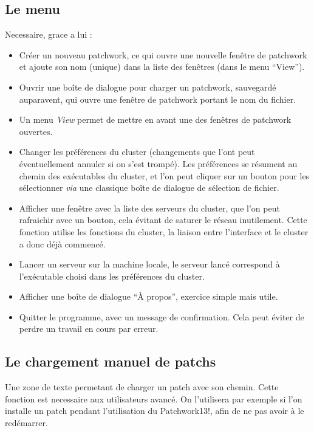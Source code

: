 \subsection{Le menu}
Necessaire, grace a lui :
\begin{itemize}
\item
  Cr\'eer un nouveau patchwork, ce qui ouvre une nouvelle fen\^etre
  de patchwork et ajoute son nom (unique) dans la liste des fen\^etres
  (dans le menu ``View'').

\item
  Ouvrir une bo\^ite de dialogue pour charger un patchwork, sauvegard\'e 
  auparavent, qui ouvre une fen\^etre de patchwork portant le nom du fichier.

\item
  Un menu {\it View} permet de mettre en avant une des fen\^etres de 
  patchwork ouvertes.

\item
  Changer les pr\'ef\'erences du cluster (changements que l'ont
  peut \'eventuellement annuler si on s'est tromp\'e).
  Les pr\'ef\'erences se r\'esument au chemin des ex\'ecutables du cluster, 
  et l'on peut cliquer sur un bouton pour les s\'electionner {\it via} une
  classique bo\^ite de dialogue de s\'election de fichier.

\item
  Afficher une fen\^etre avec la liste des serveurs du cluster,
  que l'on peut rafraichir avec un bouton, cela \'evitant de saturer le
  r\'eseau inutilement. Cette fonction utilise les fonctions du cluster,
  la liaison entre l'interface et le cluster a donc d\'ej\`a commenc\'e.

\item
  Lancer un serveur sur la machine locale, le serveur lanc\'e
  correspond \`a l'ex\'ecutable choisi dans les pr\'ef\'erences du
  cluster.

\item
  Afficher une bo\^ite de dialogue ``\`A propos'', exercice simple
  mais utile.

\item
  Quitter le programme, avec un message de confirmation. Cela
  peut \'eviter de perdre un travail en cours par erreur.
\end{itemize}

\subsection{Le chargement manuel de patchs}
Une zone de texte permetant de charger un patch avec son chemin. Cette 
fonction est necessaire aux utilisateurs avanc\'e. On l'utilisera par exemple
si l'on installe un patch pendant l'utilisation du Patchwork13!, afin de ne 
pas avoir \`a le red\'emarrer. 

